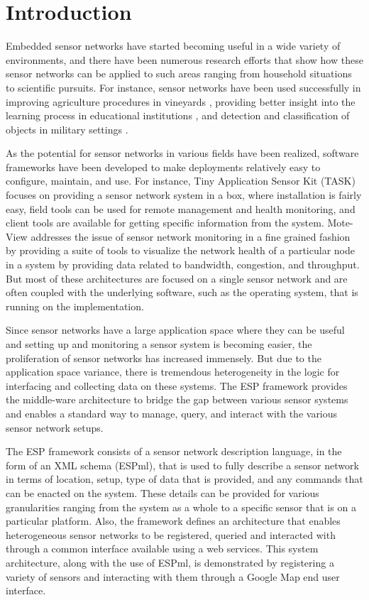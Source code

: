\section{Introduction}
Embedded sensor networks have started becoming useful in a wide variety
of environments, and there have been numerous research efforts that
show how these sensor networks can be applied to such areas ranging
from household situations to scientific pursuits.  For instance,
sensor networks have been used successfully in improving agriculture
procedures in vineyards \cite{brooke:vineyard}, providing better
insight into the learning process in educational institutions
\cite{srivastava:smart}, and detection and classification of objects
in military settings \cite{li:detection}.

As the potential for sensor networks in various fields have been realized, 
software frameworks have been 
developed to make deployments relatively easy to configure, maintain, and use. 
For instance, Tiny Application Sensor Kit (TASK) \cite{buonadonna2005tsn} focuses
on providing a sensor network system in a box, where installation is fairly easy, 
field tools can be used for remote management and health monitoring, and client tools
are available for getting specific information from the system.  Mote-View \cite{turon2005mvs}
addresses the issue of sensor network monitoring in a fine grained fashion 
by providing a suite of tools to visualize the network health of a particular node 
in a system by providing data related to bandwidth, congestion, and throughput.  But most of
these architectures are focused on a single sensor network and are often coupled
with the underlying software, such as the operating system, that is running on the implementation.

Since sensor networks have a large application space where they can be useful and setting
up and monitoring a sensor system is becoming easier, the proliferation of sensor networks has
increased immensely.  But due to the application space variance, there is tremendous heterogeneity
in the logic for interfacing and collecting data on these systems.  The ESP framework provides
the middle-ware architecture to bridge the gap between various sensor systems and enables a standard
way to manage, query, and interact with the various sensor network setups.  

The ESP framework consists of a sensor network description language, in the form of an XML schema (ESPml), that is
used to fully describe a sensor network in terms of location, setup, type of data that is provided, 
and any commands that can be enacted on the system.  These details can be provided
for various granularities ranging from the system as a whole to a specific sensor that is on a particular platform.  
Also, the framework defines an architecture that enables heterogeneous sensor networks
to be registered, queried and interacted with through a common interface available using a web services.
This system architecture, along with the use of ESPml, is demonstrated by registering a variety of sensors and
interacting with them through a Google Map end user interface.

